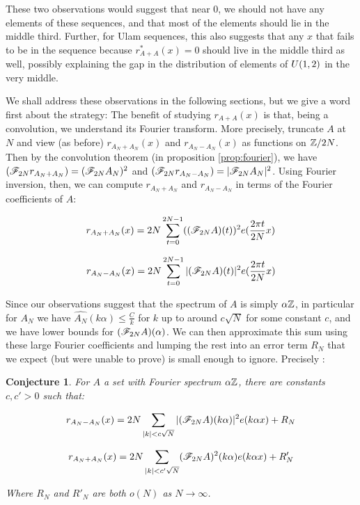 \documentclass{report}
\newtheorem{conjecture}[theorem]{Conjecture}
\theoremstyle{remark}
\numberwithin{equation}{section}
\begin{document}
These two observations would suggest that near 0, we should not have
any elements of these sequences, and that most of the elements should
lie in the middle third.  Further, for Ulam sequences, this also
suggests that any $x$ that fails to be in the sequence because
$r^*_{A+A}(x) = 0$ should live in the middle third as well, possibly
explaining the gap in the distribution of elements of $U(1,2)$ in the
very middle.  

We shall address these observations in the following sections, but we
give a word first about the strategy: The benefit of studying
$r_{A+A}(x)$ is that, being a convolution, we understand its Fourier
transform.  More precisely, truncate $A$ at $N$ and view (as before)
$r_{A_N + A_N}(x)$ and $r_{A_N - A_N}(x)$ as functions on $\mathbb{Z}/2N$.
Then by the convolution theorem (in proposition \ref{prop:fourier}),
we have $(\mathscr{F}_{2N}r_{A_N + A_N}) = (\mathscr{F}_{2N}A_N)^2$ and
$(\mathscr{F}_{2N}r_{A_N - A_N}) = |\mathscr{F}_{2N}A_N|^2$.  Using Fourier
inversion, then, we can compute $r_{A_N + A_N}$ and $r_{A_N - A_N}$ in
terms of the Fourier coefficients of $A$:

\begin{equation}\label{eqn:rAAsum}r_{A_N + A_N}(x) = 2N \sum_{t=0}^{2N-1} ((\mathscr{F}_{2N}A)(t))^2 e(\frac{2\pi t}{2N} x)\end{equation}

\begin{equation}\label{eqn:rAAdiff}r_{A_N - A_N}(x) = 2N \sum_{t=0}^{2N-1} |(\mathscr{F}_{2N}A)(t)|^2 e(\frac{2\pi t}{2N} x)\end{equation}

Since our observations suggest that the spectrum of $A$ is simply
$\alpha\mathbb{Z}$, in particular for $A_N$ we have
$\widehat{A_N}(k\alpha) \leq \frac{C}{k}$ for $k$ up to around
$c\sqrt{N}$ for some constant $c$, and we have lower bounds for
$(\mathscr{F}_{2N}A)(\alpha)$.  We can then approximate this sum using these
large Fourier coefficients and lumping the rest into an error term
$R_N$ that we expect (but were unable to prove) is small enough to
ignore.  Precisely : 


\begin{conjecture}\label{conj:spec_estimate}
  For $A$ a \relevant set with Fourier spectrum $\alpha\mathbb{Z}$, there are
  constants $c, c' > 0$ such that:

\begin{equation}\label{eqn:rAAdiff_err}
  r_{A_N - A_N}(x) = 2N\sum_{|k| < c\sqrt{N}} |(\mathscr{F}_{2N}A)(k\alpha)|^2 e(k\alpha x) + R_N
\end{equation}

\begin{equation}\label{eqn:rAAsum_err}
  r_{A_N + A_N}(x) = 2N\sum_{|k| < c'\sqrt{N}}(\mathscr{F}_{2N}A)^2(k \alpha) e(k\alpha x) + R'_N
\end{equation}
  
Where $R_N$ and $R'_N$ are both $o(N)$ as $N \to \infty$.  
\end{conjecture}
\end{document}
